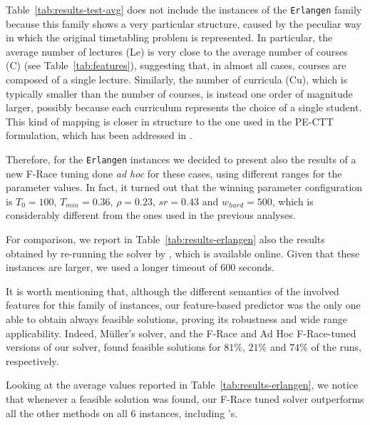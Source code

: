 \documentclass[authoryear,12pt]{article}
\newcommand{\pectt}{PE-CTT}
\begin{document}
Table~\ref{tab:results-test-avg} does not include the instances of the
\texttt{Erlangen} family because this family shows a very particular structure,
caused by the peculiar way in which the original timetabling problem is
represented.  In particular, the average number of lectures (Le) is very close
to the average number of courses (C) (see Table~\ref{tab:features}), suggesting
that, in almost all cases, courses are composed of a single lecture.  Similarly,
the number of curricula (Cu), which is typically smaller than the number of
courses, is instead one order of magnitude larger, possibly because each
curriculum represents the choice of a single student. This kind of mapping is
closer in structure to the one used in the \pectt{} formulation, which has been
addressed in \cite{CDGS12}.

Therefore, for the \texttt{Erlangen} instances we decided to present also the
results of a new F-Race tuning done \emph{ad hoc} for these cases, using
different ranges for the parameter values. In fact, it turned out that the
winning parameter configuration is $T_{0} = 100$, $T_{min} = 0.36$, $\rho =
0.23$, $sr = 0.43$ and $w_{hard} = 500$, which is considerably different from
the ones used in the previous analyses.

For comparison, we report in Table~\ref{tab:results-erlangen} also the results
obtained by re-running the solver by \cite{Mull09}, which is available online.
Given that these instances are larger, we used a longer timeout of $600$ seconds.

It is worth mentioning that, although the different semantics of the involved
features for this family of instances, our feature-based predictor was the only
one able to obtain always feasible solutions, proving its robustness and wide
range applicability.  Indeed, M\"uller's solver, and the F-Race and Ad Hoc
F-Race-tuned versions of our solver, found feasible solutions for $81\%$, $21\%$
and $74\%$ of the runs, respectively.

Looking at the average values reported in Table~\ref{tab:results-erlangen}, we
notice that whenever a feasible solution was found, our F-Race tuned solver
outperforms all the other methods on all $6$ instances, including
\citeauthor{Mull09}'s.
\end{document}
